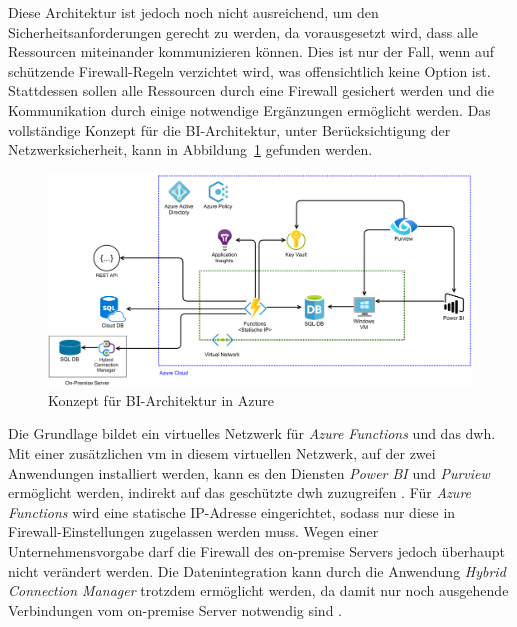 Diese Architektur ist jedoch noch nicht ausreichend, um den Sicherheitsanforderungen gerecht zu werden, da vorausgesetzt wird, dass alle Ressourcen miteinander kommunizieren können. Dies ist nur der Fall, wenn auf schützende Firewall-Regeln verzichtet wird, was offensichtlich keine Option ist. Stattdessen sollen alle Ressourcen durch eine Firewall gesichert werden und die Kommunikation durch einige notwendige Ergänzungen ermöglicht werden. Das vollständige Konzept für die BI-Architektur, unter Berücksichtigung der Netzwerksicherheit, kann in Abbildung~\ref{fig:chap03_4_konzeptArchitektur} gefunden werden.
 
 \begin{figure}[htbp]
 \centering
 \includegraphics[width=\textwidth]{gfx/konzept_2.png}
 \caption{Konzept für BI-Architektur in Azure}
\label{fig:chap03_4_konzeptArchitektur}
\end{figure}

Die Grundlage bildet ein virtuelles Netzwerk für \textit{Azure Functions} und das \ac{dwh}. Mit einer zusätzlichen \ac{vm} in diesem virtuellen Netzwerk, auf der zwei Anwendungen installiert werden, kann es den Diensten \textit{Power BI} und \textit{Purview} ermöglicht werden, indirekt auf das geschützte \ac{dwh} zuzugreifen \cite[vgl.][]{gunnarsson_pro_2020, msdoc_22_purviewSHIR}. Für \textit{Azure Functions} wird eine statische IP-Adresse eingerichtet, sodass nur diese in Firewall-Einstellungen zugelassen werden muss. Wegen einer Unternehmensvorgabe darf die Firewall des on-premise Servers jedoch überhaupt nicht verändert werden. Die Datenintegration kann durch die Anwendung \textit{Hybrid Connection Manager} trotzdem ermöglicht werden, da damit nur noch ausgehende Verbindungen vom on-premise Server notwendig sind \cite[vgl.][]{msdoc_22_func_hybridConn}.